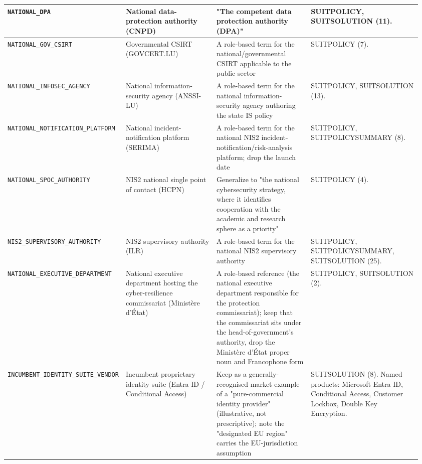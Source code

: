 \begin{center}
\begin{longtable}{@{}p{0.20\linewidth}p{0.24\linewidth}p{0.24\linewidth}p{0.28\linewidth}@{}}
\texttt{NATIONAL\_DPA} &
National data-protection authority (CNPD) &
"The competent data protection authority (DPA)" &
SUITPOLICY, SUITSOLUTION (11).\\
\midrule

\texttt{NATIONAL\_GOV\_CSIRT} &
Governmental CSIRT (GOVCERT.LU) &
A role-based term for the national/governmental CSIRT applicable to the public sector &
SUITPOLICY (7).\\
\midrule

\texttt{NATIONAL\_INFOSEC\_AGENCY} &
National information-security agency (ANSSI-LU) &
A role-based term for the national information-security agency authoring the state IS policy &
SUITPOLICY, SUITSOLUTION (13).\\
\midrule

\texttt{NATIONAL\_NOTIFICATION\_PLATFORM} &
National incident-notification platform (SERIMA) &
A role-based term for the national NIS2 incident-notification/risk-analysis platform; drop the launch date &
SUITPOLICY, SUITPOLICYSUMMARY (8).\\
\midrule

\texttt{NATIONAL\_SPOC\_AUTHORITY} &
NIS2 national single point of contact (HCPN) &
Generalize to "the national cybersecurity strategy, where it identifies cooperation with the academic and research sphere as a priority" &
SUITPOLICY (4).\\
\midrule

\texttt{NIS2\_SUPERVISORY\_AUTHORITY} &
NIS2 supervisory authority (ILR) &
A role-based term for the national NIS2 supervisory authority &
SUITPOLICY, SUITPOLICYSUMMARY, SUITSOLUTION (25).\\
\midrule

\texttt{NATIONAL\_EXECUTIVE\_DEPARTMENT} &
National executive department hosting the cyber-resilience commissariat (Minist\`ere d'\'Etat) &
A role-based reference (the national executive department responsible for the protection commissariat); keep that the commissariat sits under the head-of-government's authority, drop the Minist\`ere d'\'Etat proper noun and Francophone form &
SUITPOLICY, SUITSOLUTION (2).\\
\midrule

\texttt{INCUMBENT\_IDENTITY\_SUITE\_VENDOR} &
Incumbent proprietary identity suite (Entra ID / Conditional Access) &
Keep as a generally-recognised market example of a "pure-commercial identity provider" (illustrative, not prescriptive); note the "designated EU region" carries the EU-jurisdiction assumption &
SUITSOLUTION (8). Named products: Microsoft Entra ID, Conditional Access, Customer Lockbox, Double Key Encryption.\\

\end{longtable}
\end{center}

